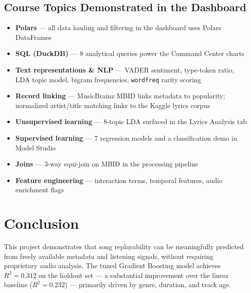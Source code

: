 \documentclass[11pt, letterpaper]{article}
\begin{document}
\subsection{Course Topics Demonstrated in the Dashboard}

\begin{itemize}[noitemsep]
    \item \textbf{Polars} — all data loading and filtering in the dashboard uses Polars DataFrames
    \item \textbf{SQL (DuckDB)} — 8 analytical queries power the Command Center charts
    \item \textbf{Text representations \& NLP} — VADER sentiment, type-token ratio, LDA topic model, bigram frequencies, \texttt{wordfreq} rarity scoring
    \item \textbf{Record linking} — MusicBrainz MBID links metadata to popularity; normalized artist/title matching links to the Kaggle lyrics corpus
    \item \textbf{Unsupervised learning} — 8-topic LDA surfaced in the Lyrics Analysis tab
    \item \textbf{Supervised learning} — 7 regression models and a classification demo in Model Studio
    \item \textbf{Joins} — 3-way equi-join on MBID in the processing pipeline
    \item \textbf{Feature engineering} — interaction terms, temporal features, audio enrichment flags

\end{itemize}

\section{Conclusion}

This project demonstrates that song replayability can be meaningfully
predicted from freely available metadata and listening signals, without
requiring proprietary audio analysis. The tuned Gradient Boosting model
achieves $R^2 = 0.312$ on the holdout set — a substantial improvement over
the linear baseline ($R^2 = 0.232$) — primarily driven by genre,
duration, and track age.
\end{document}
